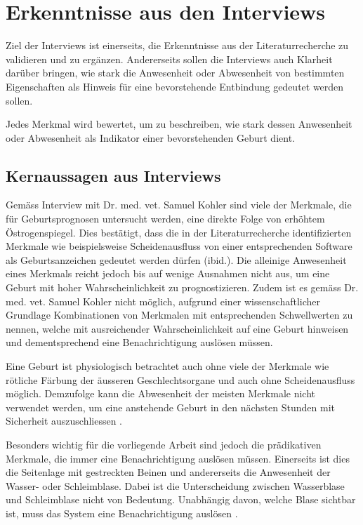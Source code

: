
\section{Erkenntnisse aus den Interviews}

Ziel der Interviews ist einerseits, die Erkenntnisse aus der Literaturrecherche zu validieren und zu ergänzen. Andererseits sollen die Interviews auch Klarheit darüber bringen, wie stark die Anwesenheit oder Abwesenheit von bestimmten Eigenschaften als Hinweis für eine bevorstehende Entbindung gedeutet werden sollen. 

Jedes Merkmal wird bewertet, um zu beschreiben, wie stark dessen Anwesenheit oder Abwesenheit als Indikator einer bevorstehenden Geburt dient.  


\subsection{Kernaussagen aus Interviews}
Gemäss Interview mit Dr. med. vet. Samuel Kohler \citep{Kohler2020} sind viele der Merkmale, die für Geburtsprognosen untersucht werden, eine direkte Folge von erhöhtem Östrogenspiegel. Dies bestätigt, dass die in der Literaturrecherche identifizierten Merkmale wie beispielsweise Scheidenausfluss von einer entsprechenden Software als Geburtsanzeichen gedeutet werden dürfen (ibid.). Die alleinige Anwesenheit eines Merkmals reicht jedoch bis auf wenige Ausnahmen nicht aus, um eine Geburt mit hoher Wahrscheinlichkeit zu prognostizieren. Zudem ist es gemäss Dr. med. vet. Samuel Kohler nicht möglich, aufgrund einer wissenschaftlicher Grundlage Kombinationen von Merkmalen mit entsprechenden Schwellwerten zu nennen, welche mit ausreichender Wahrscheinlichkeit auf eine Geburt hinweisen und dementsprechend eine Benachrichtigung auslösen müssen.

Eine Geburt ist physiologisch betrachtet auch ohne viele der Merkmale wie rötliche Färbung der äusseren Geschlechtsorgane und auch ohne Scheidenausfluss möglich. Demzufolge kann die Abwesenheit der meisten Merkmale nicht verwendet werden, um eine anstehende Geburt in den nächsten Stunden mit Sicherheit auszuschliessen \citep{Kohler2020}. 

Besonders wichtig für die vorliegende Arbeit sind jedoch die prädikativen Merkmale, die immer eine Benachrichtigung auslösen müssen. Einerseits ist dies die Seitenlage mit gestreckten Beinen und andererseits die Anwesenheit der Wasser- oder Schleimblase. Dabei ist die Unterscheidung zwischen Wasserblase und Schleimblase nicht von Bedeutung. Unabhängig davon, welche Blase sichtbar ist, muss das System eine Benachrichtigung auslösen \citep{Kohler2020}.

